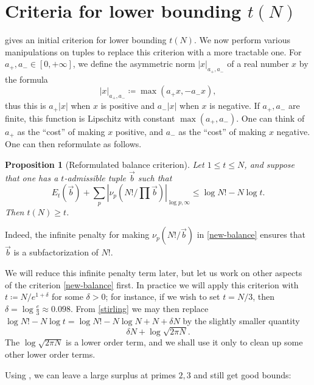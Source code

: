 \documentclass[12pt,a4paper,reqno]{amsart}
\numberwithin{equation}{section}
\theoremstyle{plain}
\newtheorem{proposition}[theorem]{Proposition}
\theoremstyle{definition}
\begin{document}
\section{Criteria for lower bounding \texorpdfstring{$t(N)$}{t(N)}}

 gives an initial criterion for lower bounding $t(N)$.  We now perform various manipulations on tuples to replace this criterion with a more tractable one.
For $a_+,a_- \in [0,+\infty]$, we define the asymmetric norm $|x|_{a_+,a_-}$ of a real number $x$ by the formula
$$ |x|_{a_+,a_-} \coloneqq \max(a_+ x, -a_- x),$$
thus this is $a_+ |x|$ when $x$ is positive and $a_- |x|$ when $x$ is negative.  If $a_+,a_-$ are finite, this function is Lipschitz with constant $\max(a_+,a_-)$.  One can think of $a_+$ as the ``cost'' of making $x$ positive, and $a_-$ as the
``cost'' of making $x$ negative.  One can then reformulate  as follows.

\begin{proposition}[Reformulated balance criterion]\label{balance-reform}  Let $1 \leq t \leq N$, and suppose that one has a $t$-admissible tuple $\vec b$ such that
\begin{equation}\label{new-balance}
    E_t(\vec b) + \sum_p |\nu_p(N!/\prod \vec b)|_{\log p,\infty} \leq \log N! - N \log t.
\end{equation}
Then $t(N) \geq t$.
\end{proposition}

Indeed, the infinite penalty for making $\nu_p(N!/\vec b)$ in \eqref{new-balance} ensures that $\vec b$ is a subfactorization of $N!$.

We will reduce this infinite penalty term later, but let us work on other aspects of the criterion \eqref{new-balance} first.  In practice we will apply this criterion with $t \coloneqq N / e^{1+\delta}$ for some $\delta>0$; for instance, if we wish to set $t = N/3$, then $\delta = \log \frac{e}{3} \approx 0.098$.  From \eqref{stirling} we may then replace $\log N! - N \log t = \log N! - N \log N + N + \delta N$ by the slightly smaller quantity
$$ \delta N + \log \sqrt{2\pi N}.$$
The $\log \sqrt{2\pi N}$ is a lower order term, and we shall use it only to clean up some other lower order terms.

Using , we can leave a large surplus at primes $2,3$ and still get good bounds:
\end{document}
